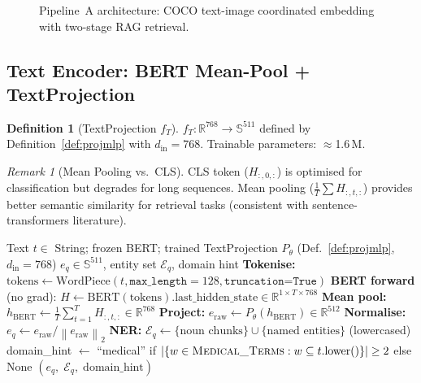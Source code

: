 \documentclass[12pt,a4paper]{article}
\theoremstyle{definition}
\newtheorem{definition}{Definition}[section]
\theoremstyle{plain}
\theoremstyle{remark}
\newtheorem{remark}{Remark}[section]
\newcommand{\R}{\mathbb{R}}
\newcommand{\Sph}{\mathbb{S}}
\newcommand{\Norm}[1]{\left\|#1\right\|}
\begin{document}
\begin{figure}[H]
{
}
\caption{Pipeline~A architecture: COCO text-image coordinated embedding with two-stage RAG retrieval.}
\label{fig:pipeline_a}
\end{figure}

\subsection{Text Encoder: BERT Mean-Pool + TextProjection}

\begin{definition}[TextProjection $f_T$]
$f_T : \R^{768} \to \Sph^{511}$ defined by Definition~\ref{def:projmlp} with $d_{\text{in}} = 768$. Trainable parameters: $\approx$1.6\,M.
\end{definition}

\begin{remark}[Mean Pooling vs.\ CLS]
CLS token ($H_{:,0,:}$) is optimised for classification but degrades for long sequences. Mean pooling ($\frac{1}{T}\sum H_{:,t,:}$) provides better semantic similarity for retrieval tasks (consistent with sentence-transformers literature).
\end{remark}

\begin{algorithm}[H]
\caption{TextEncoderV2.encode --- BERT Mean-Pool + TextProjection}
\label{alg:textencode}
\begin{algorithmic}[1]
\Require Text $t \in$ String; frozen BERT; trained TextProjection $P_\theta$ (Def.~\ref{def:projmlp}, $d_{\text{in}}=768$)
\Ensure $e_q \in \Sph^{511}$, entity set $\mathcal{E}_q$, domain hint
\State \textbf{Tokenise:} $\text{tokens} \gets \text{WordPiece}(t, \texttt{max\_length}=128, \texttt{truncation=True})$
\State \textbf{BERT forward} (no grad):
  $H \gets \text{BERT}(\text{tokens}).\text{last\_hidden\_state} \in \R^{1 \times T \times 768}$
\State \textbf{Mean pool:} $h_{\text{BERT}} \gets \frac{1}{T}\sum_{t=1}^T H_{:,t,:} \in \R^{768}$
\State \textbf{Project:} $e_{\text{raw}} \gets P_\theta(h_{\text{BERT}}) \in \R^{512}$
\State \textbf{Normalise:} $e_q \gets e_{\text{raw}} / \Norm{e_{\text{raw}}}_2$
\State \textbf{NER:} $\mathcal{E}_q \gets \{\text{noun chunks}\} \cup \{\text{named entities}\}$ (lowercased)
\State domain\_hint $\gets$ ``medical'' if $|\{w \in \textsc{Medical\_Terms} : w \subseteq t.\text{lower}()\}| \ge 2$ else None
\State \Return $(e_q,\; \mathcal{E}_q,\; \text{domain\_hint})$
\end{algorithmic}
\end{algorithm}
\end{document}

